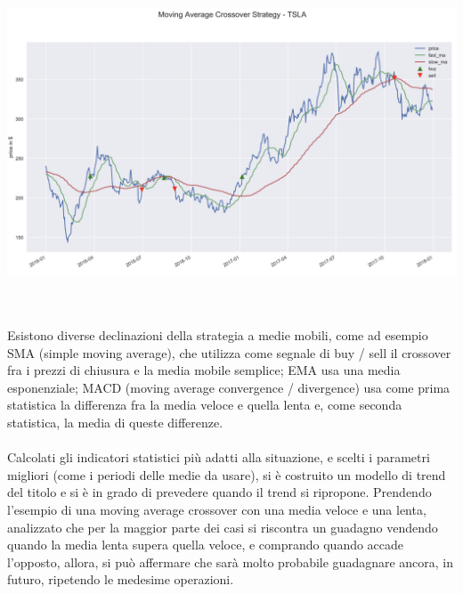 \documentclass[a4paper,12pt]{report}
\begin{document}
\begin{fig}
	\begin{center}
	\includegraphics[width=\linewidth]{moving_avg}
\label{Figura 2}
	\end{center}
\end{fig}
\\~\\Esistono diverse declinazioni della strategia a medie mobili, come ad esempio SMA (simple moving average), che utilizza come segnale di buy / sell il crossover fra i prezzi di chiusura e la media mobile semplice; EMA usa una media esponenziale; MACD (moving average convergence / divergence) usa come prima statistica la differenza fra la media veloce e quella lenta e, come seconda statistica, la media di queste differenze.
\\~\\
Calcolati gli indicatori statistici più adatti alla situazione, e scelti i parametri migliori (come i periodi delle medie da usare), si è costruito un modello di trend del titolo e si è in grado di prevedere quando il trend si ripropone. Prendendo l'esempio di una moving average crossover con una media veloce e una lenta, analizzato che per la maggior parte dei casi si riscontra un guadagno vendendo quando la media lenta supera quella veloce, e comprando quando accade l'opposto, allora, si può affermare che sarà molto probabile guadagnare ancora, in futuro, ripetendo le medesime operazioni.
\end{document}
